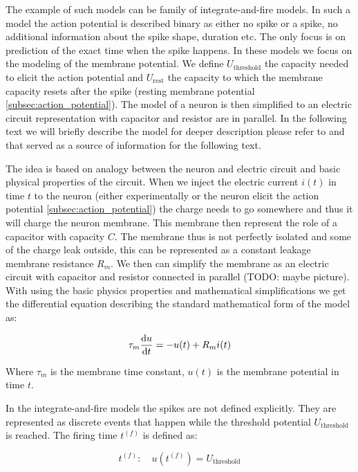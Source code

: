 The example of such models can be family of integrate-and-fire models. In such a model the action potential is described binary as either no spike or a spike, no additional information about the spike shape, duration etc. The only focus is on prediction of the exact time when the spike happens. In these models we focus on the modeling of the membrane potential. We define $U_{\text{threshold}}$ the capacity needed to elicit the action potential and $U_{\text{rest}}$ the capacity to which the membrane capacity resets after the spike (resting membrane potential \ref{subsec:action_potential}). The model of a neuron is then simplified to an electric circuit representation with capacitor and resistor are in parallel. In the following text we will briefly describe the model for deeper description please refer to \citet{dayan2005theoretical} and \citet{gerstner2002spiking} that served as a source of information for the following text.

The idea is based on analogy between the neuron and electric circuit and basic physical properties of the circuit. When we inject the electric current $i(t)$ in time $t$ to the neuron (either experimentally or the neuron elicit the action potential \ref{subsec:action_potential}) the charge needs to go somewhere and thus it will charge the neuron membrane. This membrane then represent the role of a capacitor with capacity $C$. The membrane thus is not perfectly isolated and some of the charge leak outside, this can be represented as a constant leakage membrane resistance $R_m$. We then can simplify the membrane as an electric circuit with capacitor and resistor connected in parallel (TODO: maybe picture). With using the basic physics properties and mathematical simplifications we get the differential equation describing the standard mathematical form of the model as:

\begin{equation}
    \tau_{m} \odv{u}{t} = -u(t) + R_{m}i(t)
\end{equation}
\label{eq:integrate_and_fire}

Where $\tau_{m}$ is the membrane time constant, $u(t)$ is the membrane potential in time $t$.

In the integrate-and-fire models the spikes are not defined explicitly. They are represented as discrete events that happen while the threshold potential $U_{\text{threshold}}$ is reached. The firing time $t^{(f)}$ is defined as:

\begin{equation}
    t^{(f)}: \quad u(t^{(f)}) = U_{\text{threshold}}
\end{equation}
\label{eq:firing_time}

